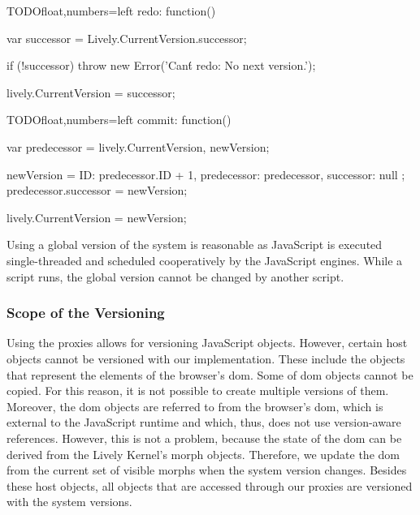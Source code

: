 \begin{code}{TODO}{float,numbers=left}
redo: function() {
    var successor = Lively.CurrentVersion.successor;
    
    if (!successor) {
        throw new Error('Can\'t redo: No next version.');
    }
    
    lively.CurrentVersion = successor;
}
\end{code}
\iffalse
\end{verbatim}\fi

\begin{code}{TODO}{float,numbers=left}
commit: function() {
    var predecessor = lively.CurrentVersion,
        newVersion;
    
    newVersion = {
        ID: predecessor.ID + 1,
        predecessor: predecessor,
        successor: null
    };
    predecessor.successor = newVersion;
    
    lively.CurrentVersion = newVersion;
}
\end{code}
\iffalse
\end{verbatim}\fi

Using a global version of the system is reasonable as JavaScript is executed single-threaded and scheduled cooperatively by the JavaScript engines.
While a script runs, the global version cannot be changed by another script.

 
\subsubsection{Scope of the Versioning} \label{subsubsec:IMPLEMENTATION:5.2.1}

Using the proxies allows for versioning JavaScript objects.
However, certain host objects cannot be versioned with our implementation.
These include the objects that represent the elements of the browser's \ac{dom}.
Some of \ac{dom} objects cannot be copied.
For this reason, it is not possible to create multiple versions of them.
Moreover, the \ac{dom} objects are referred to from the browser's \ac{dom}, which is external to the JavaScript runtime and which, thus, does not use version-aware references.
However, this is not a problem, because the state of the \ac{dom} can be derived from the Lively Kernel's morph objects.
Therefore, we update the \ac{dom} from the current set of visible morphs when the system version changes.
Besides these host objects, all objects that are accessed through our proxies are versioned with the system versions.





